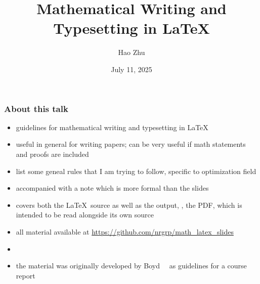 \documentclass[usepdftitle=false]{beamer}
\title{Mathematical Writing and Typesetting in \LaTeX}
\author{Hao Zhu}
\institute{Department of Computer Science\\University of Freiburg}
\date{July 11, 2025}
\begin{document}
\begin{frame}[plain]
    \titlepage{}
\end{frame}

\begin{frame}
    \frametitle{About this talk}

    \begin{itemize}\itemsep=12pt
        \item guidelines for mathematical writing and typesetting in \LaTeX
        \item useful in general for writing papers; can be very useful if math statements and proofs are included
        \item list some geneal rules that I am trying to follow, specific to optimization field
        \item accompanied with a note which is more formal than the slides
        \item covers both the \LaTeX\ source as well as the output, \ie, the PDF, which is intended to be read alongside its own source
        \item all material available at \url{https://github.com/nrgrp/math_latex_slides}
        \item[] 
        \item the material was originally developed by Boyd~\etal~\cite{boyd2014latex} as guidelines for a course report
    \end{itemize}
\end{frame}
\end{document}
